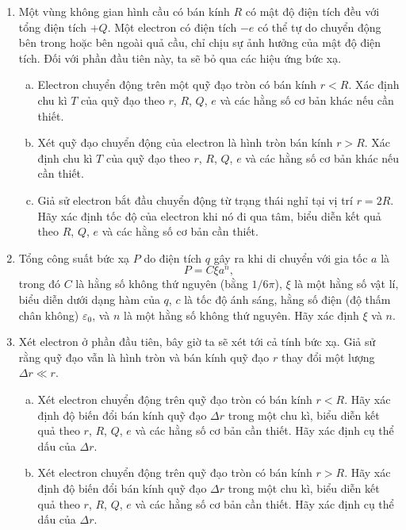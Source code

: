     \begin{vd}%
\begin{enumerate}[1)]
    \item Một vùng không gian hình cầu có bán kính $R$ có mật độ điện tích đều với tổng điện tích $+Q$. Một electron có điện tích $-e$ có thể tự do chuyển động bên trong hoặc bên ngoài quả cầu, chỉ chịu sự ảnh hưởng của mật độ điện tích. Đối với phần đầu tiên này, ta sẽ bỏ qua các hiệu ứng bức xạ.
    \begin{enumerate}[a)]
        \item Electron chuyển động trên một quỹ đạo tròn có bán kính $r<R$. Xác định chu kì $T$ của quỹ đạo theo $r$, $R$, $Q$, $e$ và các hằng số cơ bản khác nếu cần thiết.
        \item Xét quỹ đạo chuyển động của electron là hình tròn bán kính $r>R$. Xác định chu kì $T$ của quỹ đạo theo $r$, $R$, $Q$, $e$ và các hằng số cơ bản khác nếu cần thiết.
        \item Giả sử electron bắt đầu chuyển động từ trạng thái nghỉ tại vị trí $r=2R$. Hãy xác định tốc độ của electron khi nó đi qua tâm, biểu diễn kết quả theo $R$, $Q$, $e$ và các hằng số cơ bản cần thiết.
    \end{enumerate}
    \item Tổng công suất bức xạ $P$ do điện tích $q$ gây ra khi di chuyển với gia tốc $a$ là
    $$P=C\xi a^n,$$
    trong đó $C$ là hằng số không thứ nguyên (bằng $1/6\pi$), $\xi$ là một hằng số vật lí, biểu diễn dưới dạng hàm của $q$, $c$ là tốc độ ánh sáng, hằng số điện (độ thấm chân không) $\varepsilon_0$, và $n$ là một hằng số không thứ nguyên. Hãy xác định $\xi$ và $n$.
    \item Xét electron ở phần đầu tiên, bây giờ ta sẽ xét tới cả tính bức xạ. Giả sử rằng quỹ đạo vẫn là hình tròn và bán kính quỹ đạo $r$ thay đổi một lượng $\Delta r \ll r$.
    \begin{enumerate}[a)]
        \item Xét electron chuyển động trên quỹ đạo tròn có bán kính $r<R$. Hãy xác định độ biến đổi bán kính quỹ đạo $\Delta r$ trong một chu kì, biểu diễn kết quả theo $r$, $R$, $Q$, $e$ và các hằng số cơ bản cần thiết. Hãy xác định cụ thể dấu của $\Delta r$.
        \item Xét electron chuyển động trên quỹ đạo tròn có bán kính $r>R$. Hãy xác định độ biến đổi bán kính quỹ đạo $\Delta r$ trong một chu kì, biểu diễn kết quả theo $r$, $R$, $Q$, $e$ và các hằng số cơ bản cần thiết. Hãy xác định cụ thể dấu của $\Delta r$.
    \end{enumerate}
\end{enumerate}
\end{vd}
